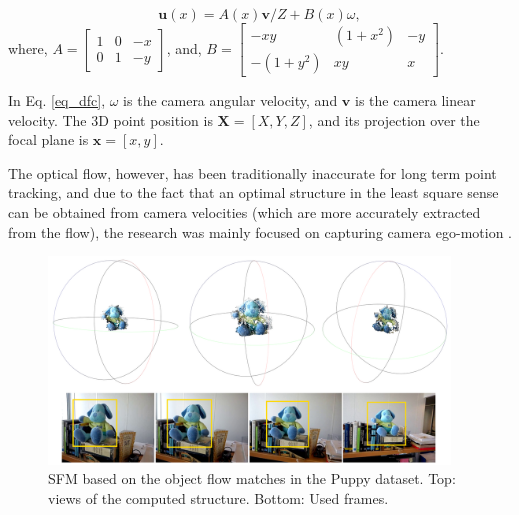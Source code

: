 \begin{equation}
\textbf{u}(x) = A(x)\textbf{v}/Z + B(x)\omega ,
\label{eq_dfc}
\end{equation}
 where, $ A =  \left[ {\begin{array}{ccc} 1 & 0 & -x\\ 0 & 1 & -y \end{array} } \right]$, 
 and, $ B =  \left[ {\begin{array}{ccc} -xy & (1+x^2) & -y\\ -(1+y^2) & xy & x \end{array} } \right]$.

In Eq. \ref{eq_dfc}, $\omega$ is 
the camera angular velocity, and $\textbf{v}$ is the camera linear velocity. 
The 3D point position is 
 $\textbf{X}=[X,Y,Z]$, and its 
 projection over the focal plane is 
 $\textbf{x}=[x,y]$.
 

The optical flow, however, has been traditionally 
inaccurate for long term point tracking, and due to the fact that an optimal structure in the least square sense can 
be obtained from camera velocities (which are more accurately extracted from the flow), the research was 
mainly focused on capturing camera ego-motion \cite{c43}. 

   \begin{figure}[tpbh]
      \centering
      \includegraphics[width=0.95\textwidth]{../images/SFM2.png}
      \caption{ SFM based on the object flow matches in the Puppy dataset. Top: views of the computed structure. Bottom: Used frames. }
      \label{sfm2}
   \end{figure}
   
